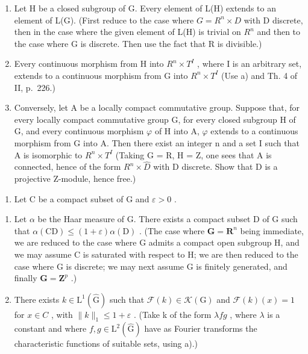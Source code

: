 \begin{enumerate}
\def\labelenumi{\alph{enumi})}
\item
  Let H be a closed subgroup of G. Every element of L(H) extends to an element of L(G). (First reduce to the case where \(G = R^{n} \times D\) with D discrete, then in the case where the given element of L(H) is trivial on \(R^{n}\) and then to the case where G is discrete. Then use the fact that R is divisible.)
\item
  Every continuous morphism from H into \(R^{n} \times T^{I}\) , where I is an arbitrary set, extends to a continuous morphism from G into \(R^{n} \times T^{I}\) (Use a) and Th. 4 of II, p.~226.)
\item
  Conversely, let A be a locally compact commutative group. Suppose that, for every locally compact commutative group G, for every closed subgroup H of G, and every continuous morphism \(\varphi\) of H into A, \(\varphi\) extends to a continuous morphism from G into A. Then there exist an integer n and a set I such that A is isomorphic to \(R^{n} \times T^{I}\) (Taking G = R, H = Z, one sees that A is connected, hence of the form \(R^{n} \times \widehat{D}\) with D discrete. Show that D is a projective Z-module, hence free.)
\end{enumerate}

\begin{enumerate}
\def\labelenumi{\arabic{enumi})}
\setcounter{enumi}{12}
\tightlist
\item
  Let C be a compact subset of G and \(\varepsilon > 0\) .
\end{enumerate}

\begin{enumerate}
\def\labelenumi{\alph{enumi})}
\item
  Let \(\alpha\) be the Haar measure of G. There exists a compact subset D of G such that \(\alpha(\mathrm{CD}) \leqslant (1 + \varepsilon)\alpha(\mathrm{D})\) . (The case where \(\mathbf{G} = \mathbf{R}^n\) being immediate, we are reduced to the case where G admits a compact open subgroup H, and we may assume C is saturated with respect to H; we are then reduced to the case where G is discrete; we may next assume G is finitely generated, and finally \(\mathbf{G} = \mathbf{Z}^p\) .)
\item
  There exists \(k \in \mathrm{L}^{1}(\widehat{\mathrm{G}})\) such that \(\mathcal{F}(k) \in \mathcal{K}(\mathrm{G})\) and \(\mathcal{F}(k)(x) = 1\) for \(x \in C\) , with \(\|k\|_{1} \leqslant 1 + \varepsilon\) . (Take k of the form \(\lambda fg\) , where \(\lambda\) is a constant and where \(f, g \in \mathrm{L}^{2}(\widehat{\mathrm{G}})\) have as Fourier transforms the characteristic functions of suitable sets, using a).)
\end{enumerate}

